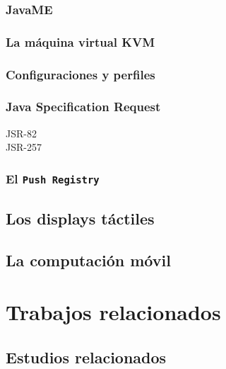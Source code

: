 \subsubsection{JavaME}

\subsubsection{La máquina virtual \acs{KVM}}

\subsubsection{Configuraciones y perfiles}

\subsubsection{Java Specification Request}
\begin{description}
\item[\acs{JSR}-82] %
\item[\acs{JSR}-257] %
\end{description}

\subsubsection{El \texttt{Push Registry}}

  \subsection{Los displays táctiles}

  \subsection{La computación móvil}

\section{Trabajos relacionados}
  \subsection{Estudios relacionados}
  \label{subsec:related}
